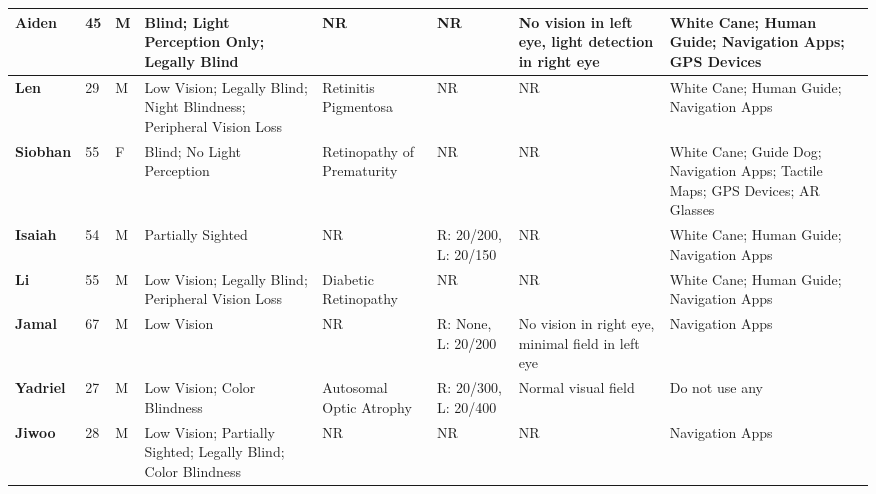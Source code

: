 \begin{table}[h!]
\begin{tabular}{p{1.4cm}p{0.3cm}p{1.0cm}p{2.0cm}p{1.5cm}p{2.0cm}p{2.0cm}p{4.0cm}}
      \textbf{Aiden}&    45& M&   Blind; Light Perception Only; Legally Blind&     NR&    NR&     No vision in left eye, light detection in right eye&  White Cane; Human Guide; Navigation Apps; GPS Devices\\ 
    \midrule
    
      \textbf{Len}&    29& M&  Low Vision; Legally Blind; Night Blindness; Peripheral Vision Loss&    Retinitis Pigmentosa&    NR&     NR&  White Cane; Human Guide; Navigation Apps\\ 
    \midrule
    
      \textbf{Siobhan}&    55& F&  Blind; No Light Perception&   Retinopathy of Prematurity&    NR&     NR&  White Cane; Guide Dog; Navigation Apps; Tactile Maps; GPS Devices; AR Glasses\\ 
    \midrule
    
      \textbf{Isaiah}&    54& M&  Partially Sighted&    NR&    R: 20/200, L: 20/150&     NR&  White Cane; Human Guide; Navigation Apps\\ 
    \midrule
    
      \textbf{Li}&    55& M&  Low Vision; Legally Blind; Peripheral Vision Loss&    Diabetic Retinopathy&    NR&     NR&  White Cane; Human Guide; Navigation Apps\\ 
    \midrule

      \textbf{Jamal}&    67& M&  Low Vision&    NR&    R: None, L: 20/200&     No vision in right eye, minimal field in left eye&  Navigation Apps\\ 
    \midrule

      \textbf{Yadriel}&    27& M&  Low Vision; Color Blindness&    Autosomal Optic Atrophy&    R: 20/300, L: 20/400&     Normal visual field&  Do not use any\\ 
    \midrule

      \textbf{Jiwoo}&    28& M&  Low Vision; Partially Sighted; Legally Blind; Color Blindness&    NR&    NR&     NR&  Navigation Apps\\ 
    
     \bottomrule
    \end{tabular}
\end{table}